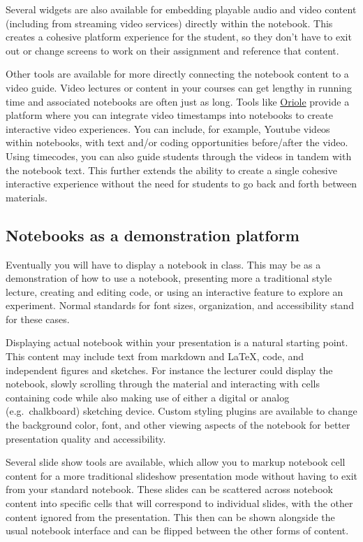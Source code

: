 \documentclass[]{book}
\begin{document}
Several widgets are also available for embedding playable audio and
video content (including from streaming video services) directly within
the notebook. This creates a cohesive platform experience for the
student, so they don't have to exit out or change screens to work on
their assignment and reference that content.

Other tools are available for more directly connecting the notebook
content to a video guide. Video lectures or content in your courses can
get lengthy in running time and associated notebooks are often just as
long. Tools like
\href{https://www.safaribooksonline.com/oriole/}{Oriole} provide a
platform where you can integrate video timestamps into notebooks to
create interactive video experiences. You can include, for example,
Youtube videos within notebooks, with text and/or coding opportunities
before/after the video. Using timecodes, you can also guide students
through the videos in tandem with the notebook text. This further
extends the ability to create a single cohesive interactive experience
without the need for students to go back and forth between materials.

\subsection{Notebooks as a demonstration
platform}\label{notebooks-as-a-demonstration-platform}

Eventually you will have to display a notebook in class. This may be as
a demonstration of how to use a notebook, presenting more a traditional
style lecture, creating and editing code, or using an interactive
feature to explore an experiment. Normal standards for font sizes,
organization, and accessibility stand for these cases.

Displaying actual notebook within your presentation is a natural
starting point. This content may include text from markdown and LaTeX,
code, and independent figures and sketches. For instance the lecturer
could display the notebook, slowly scrolling through the material and
interacting with cells containing code while also making use of either a
digital or analog (e.g.~chalkboard) sketching device. Custom styling
plugins are available to change the background color, font, and other
viewing aspects of the notebook for better presentation quality and
accessibility.

Several slide show tools are available, which allow you to markup
notebook cell content for a more traditional slideshow presentation mode
without having to exit from your standard notebook. These slides can be
scattered across notebook content into specific cells that will
correspond to individual slides, with the other content ignored from the
presentation. This then can be shown alongside the usual notebook
interface and can be flipped between the other forms of content.
\end{document}
